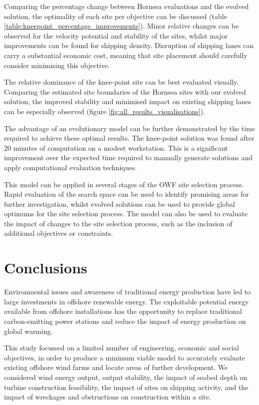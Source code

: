 \documentclass[preprint,12pt]{elsarticle}
\begin{document}
Comparing the percentage change between Hornsea evaluations and the evolved solution, the optimality of each site per objective can be discussed (table \ref{table:kneepoint_percentage_improvements}). Minor relative changes can be observed for the velocity potential and stability of the sites, whilst major improvements can be found for shipping density. Disruption of shipping lanes can carry a substantial economic cost, meaning that site placement should carefully consider minimising this objective. 

The relative dominance of the knee-point site can be best evaluated visually. Comparing the estimated site boundaries of the Hornsea sites with our evolved solution, the improved stability and minimised impact on existing shipping lanes can be especially observed (figure \ref{fig:all_results_visualisations}).

The advantage of an evolutionary model can be further demonstrated by the time required to achieve these optimal results. The knee-point solution was found after 20 minutes of computation on a modest workstation. This is a significant improvement over the expected time required to manually generate solutions and apply computational evaluation techniques.

This model can be applied in several stages of the OWF site selection process. Rapid evaluation of the search space can be used to identify promising areas for further investigation, whilst evolved solutions can be used to provide global optimums for the site selection process. The model can also be used to evaluate the impact of changes to the site selection process, such as the inclusion of additional objectives or constraints.

\newpage
\section{Conclusions}
Environmental issues and awareness of traditional energy production have led to large investments in offshore renewable energy. The exploitable potential energy available from offshore installations has the opportunity to replace traditional carbon-emitting power stations and reduce the impact of energy production on global warming.

This study focussed on a limited number of engineering, economic and social objectives, in order to produce a minimum viable model to accurately evaluate existing offshore wind farms and locate areas of further development. We considered wind energy output, output stability, the impact of seabed depth on turbine construction feasibility, the impact of sites on shipping activity, and the impact of wreckages and obstructions on construction within a site.
\end{document}
